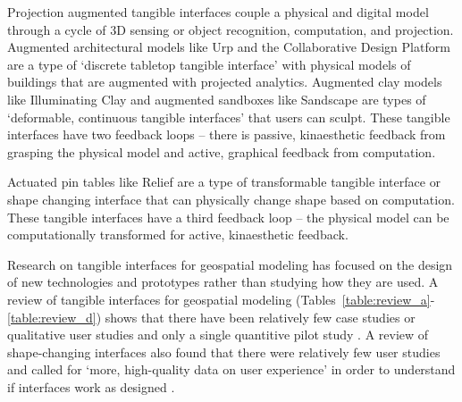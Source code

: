 \documentclass[prodmode,acmtochi]{acmsmall} %
\begin{document}
Projection augmented tangible interfaces 
couple a physical and digital model
through a cycle of 3D sensing or object recognition,
computation, and projection. 
%
Augmented architectural models
like Urp \cite{Underkoffler1999} 
and the Collaborative Design Platform \cite{Schubert2011}
are a type of 
`discrete tabletop tangible interface' \cite{Ishii2012}
with physical models of buildings 
that are augmented with projected analytics.
%
Augmented clay models 
like Illuminating Clay \cite{Piper2002a} 
and augmented sandboxes like Sandscape \cite{Ishii2004} 
are types of 
`deformable, continuous tangible interfaces' \cite{Ishii2012}
that users can sculpt. 
%
These tangible interfaces 
have two feedback loops -- 
there is passive, kinaesthetic feedback from grasping the physical model 
and active, graphical feedback from computation.

Actuated pin tables
like Relief \cite{Leithinger2009}
are a type of transformable tangible interface \cite{Ishii2012} 
or shape changing interface \cite{Rasmussen2012}
that can physically change shape based on computation.
%
These tangible interfaces 
have a third feedback loop --
the physical model
can be computationally transformed
for active, kinaesthetic feedback. 

Research on tangible interfaces for geospatial modeling 
has focused on the design of new technologies and prototypes
rather than studying how they
are used. 
%
A review of tangible interfaces for geospatial modeling 
(Tables~\ref{table:review_a}-\ref{table:review_d})
shows that there have been 
relatively few case studies \cite{Ishii2002,Tateosian2010,Petrasova2015} 
or qualitative user studies \cite{Shamonsky2003}
and only a single quantitive pilot study \cite{Harmon2016}.
%
A review of shape-changing interfaces 
also found that there were relatively few user studies
and called for `more, high-quality data on user experience'
in order to understand if interfaces work as designed
\cite{Rasmussen2012}.


% 
% 
\end{document}
